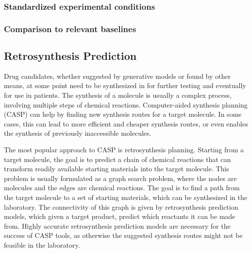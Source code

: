 \subsubsection{Standardized experimental conditions}

\subsubsection{Comparison to relevant baselines}



\subsection{Retrosynthesis Prediction\label{sec:retrosynthesis}}
Drug candidates, whether suggested by generative models or found by other means,
at some point need to be synthesized in for further testing and 
eventually for use in patients. The synthesis of a molecule is usually a complex
process, involving multiple steps of chemical reactions. Computer-aided synthesis 
planning (CASP) can help by finding new synthesis routes for a target molecule.
In some cases, this can lead to more efficient and cheaper synthesis routes, or
even enables the synthesis of previously inaccessible molecules.

The most popular approach to CASP is retrosynthesis planning. Starting from a
target molecule, the goal is to predict a chain of chemical reactions that can
transform readily available starting materials into the target molecule. This
problem is usually formulated as a graph search problem, where the nodes are
molecules and the edges are chemical reactions. The goal is to find a path from
the target molecule to a set of starting materials, which can be synthesized in
the laboratory. The connectivity of this graph is given by retrosynthesis
prediction models, which given a target product, predict which reactants it can
be made from. Highly accurate retrosynthesis prediction models are necessary for
the success of CASP tools, as otherwise the suggested synthesis routes might not
be feasible in the laboratory.

